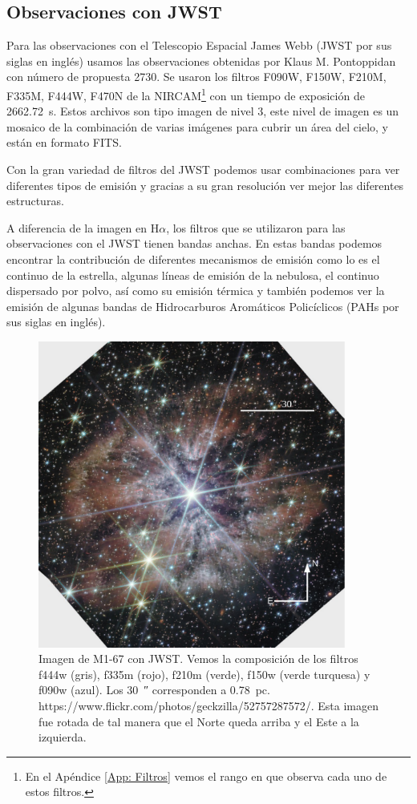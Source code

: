 \documentclass{book}
\begin{document}
\subsection{Observaciones con JWST}

Para las observaciones con el Telescopio Espacial James Webb (JWST por sus siglas en inglés) usamos las observaciones obtenidas por Klaus M. Pontoppidan con número de propuesta 2730. Se usaron los filtros F090W, F150W, F210M, F335M, F444W, F470N de la NIRCAM\footnote{En el Apéndice \ref{App: Filtros} vemos el rango en que observa cada uno de estos filtros.} con un tiempo de exposición de \SI{2662.72}{s}. Estos archivos son tipo imagen de nivel 3, este nivel de imagen es un mosaico de la combinación de varias imágenes para cubrir un área del cielo, y están en formato FITS.

Con la gran variedad de filtros del JWST podemos usar combinaciones para ver diferentes tipos de emisión y gracias a su gran resolución ver mejor las diferentes estructuras.

A diferencia de la imagen en H$\alpha$, los filtros que se utilizaron para las observaciones con el JWST tienen bandas anchas. En estas bandas podemos encontrar la contribución de diferentes mecanismos de emisión como lo es el continuo de la estrella, algunas líneas de emisión de la nebulosa, el continuo dispersado por polvo, así como su emisión térmica y también podemos ver la emisión de algunas bandas de Hidrocarburos Aromáticos Policíclicos  (PAHs por sus siglas en inglés).

\begin{figure}[htb]
    \centering
    \includegraphics[width=0.9\textwidth]{ultimas correcciones/WR124_JWST.pdf}
    \caption{Imagen de M1-67 con JWST. Vemos la composición de los filtros f444w (gris), f335m (rojo), f210m (verde), f150w (verde turquesa) y f090w (azul). Los \SI{30}{\arcsecond} corresponden a \SI{0.78}{pc}. https://www.flickr.com/photos/geckzilla/52757287572/. Esta imagen fue rotada de tal manera que el Norte queda arriba y el Este a la izquierda.}
    \label{fig:M1-67JWST}
\end{figure}
\end{document}
